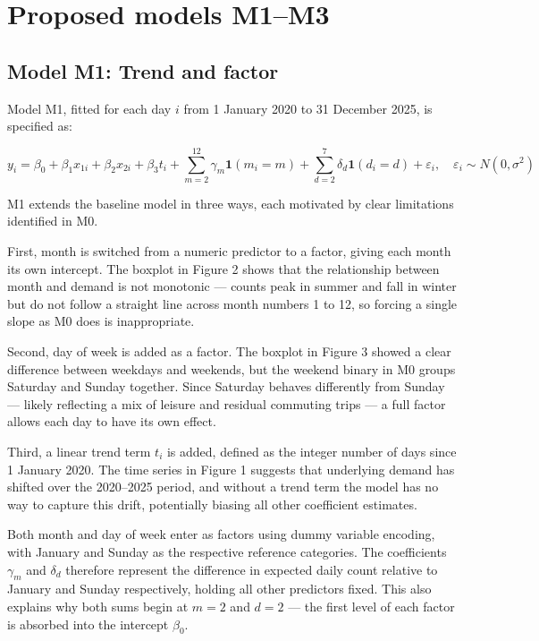 \documentclass[
]{article}
\begin{document}
\section{Proposed models M1--M3}\label{proposed-models-m1m3}

\subsection{Model M1: Trend and factor}\label{model-m1-trend-and-factor}

Model M1, fitted for each day \(i\) from 1 January 2020 to 31 December 2025,
is specified as:

\[
y_i = \beta_0 + \beta_1 x_{1i} + \beta_2 x_{2i} + \beta_3 t_i
+ \sum_{m=2}^{12} \gamma_m \mathbf{1}(m_i = m) 
+ \sum_{d=2}^{7} \delta_d \mathbf{1}(d_i = d) 
+ \varepsilon_i, \quad \varepsilon_i \sim N(0, \sigma^2)
\]

M1 extends the baseline model in three ways, each motivated by clear limitations
identified in M0.

First, month is switched from a numeric predictor to a factor, giving each month
its own intercept. The boxplot in Figure 2 shows that the relationship between month
and demand is not monotonic --- counts peak in summer and fall in winter but do not
follow a straight line across month numbers 1 to 12, so forcing a single slope as
M0 does is inappropriate.

Second, day of week is added as a factor. The boxplot in Figure 3 showed a clear
difference between weekdays and weekends, but the weekend binary in M0 groups
Saturday and Sunday together. Since Saturday behaves differently from Sunday ---
likely reflecting a mix of leisure and residual commuting trips --- a full factor
allows each day to have its own effect.

Third, a linear trend term \(t_i\) is added, defined as the integer number of days
since 1 January 2020. The time series in Figure 1 suggests that underlying demand
has shifted over the 2020--2025 period, and without a trend term the model has no
way to capture this drift, potentially biasing all other coefficient estimates.

Both month and day of week enter as factors using dummy variable encoding,
with January and Sunday as the respective reference categories. The
coefficients \(\gamma_m\) and \(\delta_d\) therefore represent the difference
in expected daily count relative to January and Sunday respectively,
holding all other predictors fixed. This also explains why both sums begin
at \(m = 2\) and \(d = 2\) --- the first level of each factor is absorbed into
the intercept \(\beta_0\).
\end{document}
